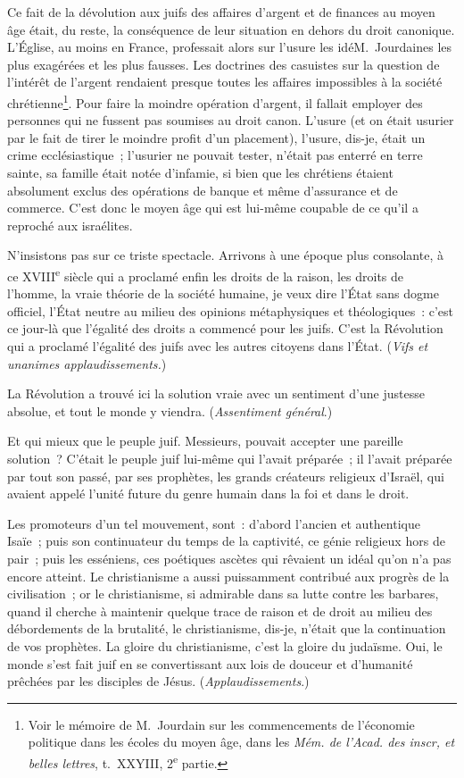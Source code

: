 \documentclass[french,twoside]{book} %
\newcommand\orgName[1]{#1}
\newcommand\persName[1]{#1}
\newcommand\placeName[1]{#1}
\begin{document}
Ce fait de la dévolution aux juifs des affaires d’argent et de finances au moyen âge était, du reste, la conséquence de leur situation en dehors du droit canonique. L’{\orgName Église}, au moins en {\placeName France}, professait alors sur l’usure les idéM. Jourdaines les plus exagérées et les plus fausses. Les doctrines des casuistes sur la question de l’intérêt de l’argent rendaient presque toutes les affaires impossibles à la société chrétienne\footnote{ Voir le mémoire de {\persName M. Jourdain} sur les commencements de l’économie politique dans les écoles du moyen âge, dans les \emph{Mém. de l’Acad. des inscr, et belles lettres}, t. XXYIII, 2\textsuperscript{e} partie.}. Pour faire la moindre opération d’argent, il fallait employer des personnes qui ne fussent pas soumises au droit canon. L’usure (et on était usurier par le fait de tirer le moindre profit d’un placement), l’usure, dis-je, était un crime ecclésiastique ; l’usurier ne pouvait tester, n’était pas enterré en terre sainte, sa famille était notée d’infamie, si bien que les {\orgName chrétiens} étaient absolument exclus des opérations de banque et même d’assurance et de commerce. C’est donc le moyen âge qui est lui-même coupable de ce qu’il a reproché aux {\orgName israélites}.\par
N’insistons pas sur ce triste spectacle. Arrivons à une époque plus consolante, à ce XVIII\textsuperscript{e} siècle qui a proclamé enfin les droits de la raison, les droits de l’homme, la vraie théorie de la société humaine, je veux dire l’État sans dogme officiel, l’État neutre au milieu des opinions métaphysiques et théologiques : c’est ce jour-là que l’égalité des droits a commencé pour les juifs. C’est la Révolution qui a proclamé l’égalité des {\orgName juifs} avec les autres citoyens dans l’État. ({\itshape Vifs et unanimes applaudissements.})\par
La Révolution a trouvé ici la solution vraie avec un sentiment d’une justesse absolue, et tout le monde y viendra. ({\itshape Assentiment général}.)\par
Et qui mieux que le {\orgName peuple juif}. Messieurs, pouvait accepter une pareille solution ? C’était le {\orgName peuple juif} lui-même qui l’avait préparée ; il l’avait préparée par tout son passé, par ses {\orgName prophètes}, les grands créateurs religieux d’{\orgName Israël}, qui avaient appelé l’unité future du genre humain dans la foi et dans le droit.\par
Les promoteurs d’un tel mouvement, sont : d’abord l’ancien et authentique {\persName Isaïe} ; puis son continuateur du temps de la captivité, ce génie religieux hors de pair ; puis les esséniens, ces poétiques ascètes qui rêvaient un idéal qu’on n’a pas encore atteint. Le christianisme a aussi puissamment contribué aux progrès de la civilisation ; or le christianisme, si admirable dans sa lutte contre les barbares, quand il cherche à maintenir quelque trace de raison et de droit au milieu des débordements de la brutalité, le christianisme, dis-je, n’était que la continuation de vos prophètes. La gloire du christianisme, c’est la gloire du judaïsme. Oui, le monde s’est fait juif en se convertissant aux lois de douceur et d’humanité prêchées par les disciples de {\persName Jésus}. ({\itshape Applaudissements}.)\par
\end{document}
